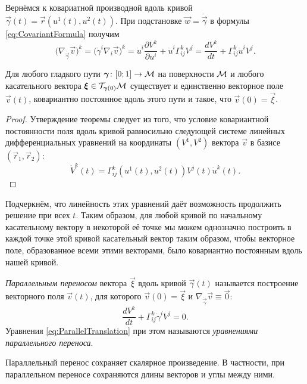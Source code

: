 Вернёмся к ковариатной производной вдоль кривой $\vec{\gamma}(t) = \vec{r}(u^1(t), u^2(t))$. При подстановке $\vec{w} = \dot{\vec{\gamma}}$ в формулы \eqref{eq:CovariantFormula} получим
\[
	\big(\nabla_{\dot{\vec{\gamma}}}\vec{v}\big)^k = \big(\dot{\gamma}^i\nabla_i\vec{v}\big)^k = \dot{u}^i\frac{\partial V^k}{\partial u^i} + \dot{u}^i\Gamma_{ij}^kV^j = \frac{dV^k}{dt} + \Gamma_{ij}^k\dot{u}^iV^j.
\]

\begin{theorem}
	Для любого гладкого пути $\boldsymbol{\gamma}\colon [0; 1] \to \mathcal{M}$ на поверхности $\mathcal{M}$ и любого касательного вектора $\boldsymbol{\xi} \in \mathcal{T}_{\boldsymbol{\gamma}(0)}\mathcal{M}$ существует и единственно векторное поле $\vec{v}(t)$, ковариантно постоянное вдоль этого пути и такое, что $\vec{v}(0) = \vec{\xi}$.
\end{theorem}

\begin{proof}
	Утверждение теоремы следует из того, что условие ковариантной постоянности поля вдоль кривой равносильно следующей системе линейных дифференциальных уравнений на координаты $(V^1, V^2)$ вектора $\vec{v}$ в базисе $(\vec{r}_1, \vec{r}_2)$:
	\[
		\dot{V}^k(t) = \Gamma_{ij}^k(u^1(t), u^2(t))V^j(t)\dot{u}^k(t).
	\]
\end{proof}

Подчеркнём, что линейность этих уравнений даёт возможность продолжить решение при всех $t$. Таким образом, для любой кривой по начальному касательному вектору в некоторой её точке мы можем однозначно построить в каждой точке этой кривой касательный вектор таким образом, чтобы векторное поле, образованное всеми этими векторами, было ковариантно постоянным вдоль нашей кривой.

\begin{definition}
	\textit{Параллельным переносом} вектора $\vec{\xi}$ вдоль кривой $\vec{\gamma}(t)$ называется построение векторного поля $\vec{v}(t)$, для которого $\vec{v}(0) = \vec{\xi}$ и $\nabla_{\dot{\vec{\gamma}}}\vec{v} \equiv \vec{0}$:
	\begin{equation} \label{eq:ParallelTranslation}
		\frac{dV^k}{dt} + \Gamma_{ij}^k\dot{\gamma}^iV^j = 0.
	\end{equation}
	Уравнения \eqref{eq:ParallelTranslation} при этом называются \textit{уравнениями параллельного переноса}.
\end{definition}

\begin{lemma}
	Параллельный перенос сохраняет скалярное произведение. В частности, при параллельном переносе сохраняются длины векторов и углы между ними.
\end{lemma}

